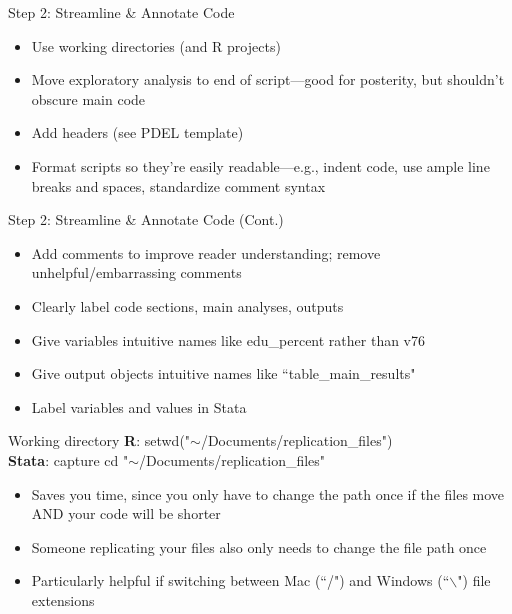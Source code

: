 \documentclass[12pt, compress]{beamer} %
\renewcommand{\texttt}[2][ceruleanblue]{\textcolor{#1}{\ttfamily #2}}%
\let\olditem\item %
\renewcommand{\item}{%
\olditem\vspace{\fill}}
\begin{document}
	 \begin{frame}{Step 2: Streamline \& Annotate Code}
	 	
	 	\begin{itemize}
	 		\item Use working directories (and R projects)
	 		\item Move exploratory analysis to end of script---good for posterity, but shouldn't obscure main code
	 		\item Add headers (see PDEL template)
	 		\item Format scripts so they're easily readable---e.g., indent code, use ample line breaks and spaces, standardize comment syntax
	 	\end{itemize}
	 \end{frame}
	 
	 \begin{frame}{Step 2: Streamline \& Annotate Code (Cont.)}
	 	\begin{itemize}
	 		\item Add comments to improve reader understanding; remove unhelpful/embarrassing comments
			\item Clearly label code sections, main analyses, outputs 
			\item Give variables intuitive names like \texttt{edu\_percent} rather than \texttt{v76}
			\item Give output objects intuitive names like ``table\_main\_results"
			\item Label variables and values in Stata
	 	\end{itemize}
	 \end{frame}
	 
	 \begin{frame}{Working directory}  
			\textbf{R}: \texttt{setwd("$\sim$/Documents/replication\_files")} \\
		 	\textbf{Stata}: \texttt{capture cd "$\sim$/Documents/replication\_files"}
		 	
		 	\bigskip
		 	
			 \begin{itemize}
			 	\item Saves you time, since you only have to change the path once if the files move AND your code will be shorter
			 	\item Someone replicating your files also only needs to change the file path once
			 	\item Particularly helpful if switching between Mac (``/") and Windows (``$\backslash$") file extensions
			 \end{itemize}
	 \end{frame}
\end{document}
